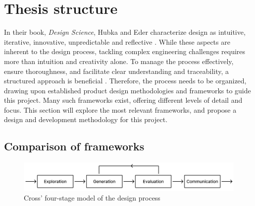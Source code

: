 \section{Thesis structure}

In their book, \textit{Design Science}, Hubka and Eder characterize design as intuitive, iterative, innovative, unpredictable and reflective \cite{hubka_eder}. While these aspects are inherent to the design process, tackling complex engineering challenges requires more than intuition and creativity alone. To manage the process effectively, ensure thoroughness, and facilitate clear understanding and traceability, a structured approach is beneficial \cite{eder}. Therefore, the process needs to be organized, drawing upon established product design methodologies and frameworks to guide this project. Many such frameworks exist, offering different levels of detail and focus. This section will explore the most relevant frameworks, and propose a design and development methodology for this project.

\subsection{Comparison of frameworks}
\vspace{2em}
\begin{figure}[htb!]
  \centering
  \includegraphics[width=\textwidth]{Pictures/Figures/cross.png}
  \caption{Cross' four-stage model of the design process}
  \label{fig:cross}
\end{figure}

